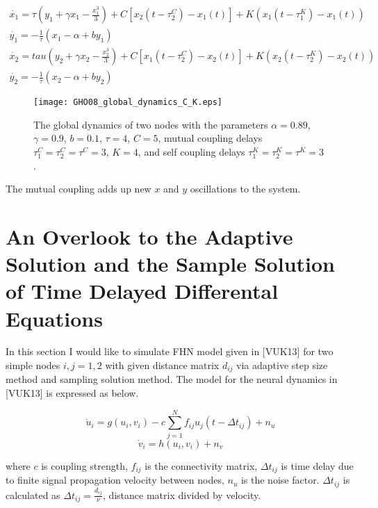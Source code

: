 \documentclass[12pt]{article}
\begin{document}
\begin{subequations}
 \begin{align}\dot{x_1} = \tau (y_1 + \gamma x_1 - \frac{x_1^3}{3}) + C [x_2(t-\tau_2^C)-x_1(t)] + K(x_1(t-\tau_1^K) - x_1(t)) \label{eqn: frobenius 19}\\  \dot{y_1} = -\frac{1}{\tau} (x_1 - \alpha + b y_1) \label{eqn: frobenius 20} \\ \dot{x_2}=tau (y_2 + \gamma x_2 - \frac{x_2^3}{3}) + C [x_1(t-\tau_2^C)-x_2(t)]+ K(x_2(t-\tau_2^K) - x_2(t)) \label{eqn: frobenius 21} \\  \dot{y_2} = -\frac{1}{\tau} (x_2 - \alpha + by_2) \label{eqn: frobenius 22}\end{align} 
\end{subequations}

\newpage

\begin{figure}[h!]
	\centering
	\texttt{[image: GHO08\_global\_dynamics\_C\_K.eps]}
		\caption{The global dynamics of two nodes with the parameters $\alpha = 0.89$, $\gamma=0.9$, $b=0.1$, $\tau = 4$, $C=5$, mutual coupling delays $\tau_1^C=\tau_2^C=\tau^C=3$, $K=4$, and self coupling delays $\tau_1^K=\tau_2^K=\tau^K=3$ .}
\end{figure}

The mutual coupling adds up new $x$ and $y$ oscillations to the system.

\section{An Overlook to the Adaptive Solution and the Sample Solution of Time Delayed Differental Equations}

In this section I would like to simulate FHN model given in [VUK13] for two simple nodes $i,j={1,2}$ with given distance matrix $d_{ij}$ via adaptive step size method and sampling solution method. The model for the neural dynamics in [VUK13] is expressed as below.

\begin{equation}
 \dot{u}_i=g(u_i,v_i)-c \sum_{j=1}^N  f_{ij} u_j(t-\Delta t_{ij})+n_u
\end{equation}
\begin{equation}
 \dot{v}_i=h(u_i,v_i)+n_v
\end{equation}

where $c$ is coupling strength, $f_{ij}$ is the connectivity matrix, $\Delta t_{ij}$ is time delay due to finite signal propagation velocity between nodes, $n_u$ is the noise factor. $\Delta t_{ij}$ is calculated as $\Delta t_{ij}=\frac{d_{ij}}{\nu}$, distance matrix divided by velocity. 
\end{document}
